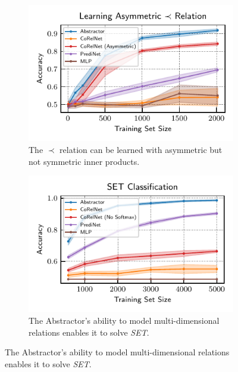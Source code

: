 \begin{figure}[t]
    \centering
    \begin{subfigure}[t]{0.32\textwidth}
        \centering\captionsetup{width=.9\linewidth}
        \vskip-20pt
        \includegraphics[width=\textwidth]{figures/experiments/pairwise_order_learning_curves.pdf}
        \vskip-5pt
        \caption{The $\prec$ relation can be learned with asymmetric but not symmetric inner products.}\label{fig:exp_order_relation}
    \end{subfigure}
    \begin{subfigure}[t]{0.32\textwidth}
        \centering\captionsetup{width=.9\linewidth}
        \vskip-20pt
        \includegraphics[width=\textwidth]{figures/experiments/set_classification.pdf}
        \vskip-5pt
        \caption{The Abstractor's ability to model multi-dimensional relations enables it to solve \textit{SET}.}\label{fig:exp_set_classification}

\end{subfigure}
\end{figure}
